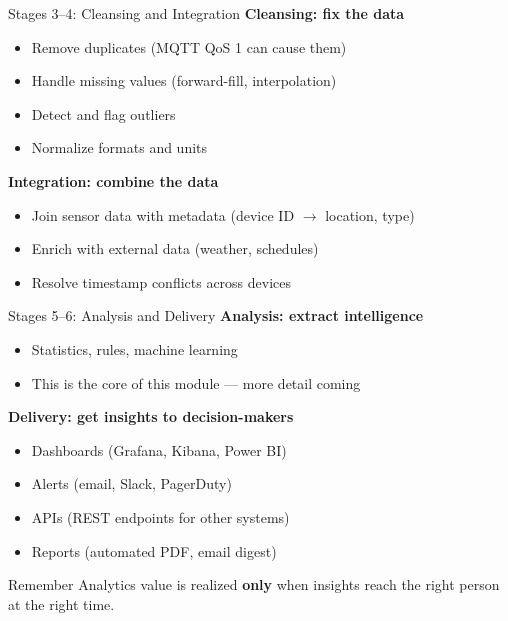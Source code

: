 \documentclass[aspectratio=169,11pt]{beamer}
\begin{document}
\begin{frame}{Stages 3--4: Cleansing and Integration}
    \textbf{Cleansing: fix the data}
    \begin{itemize}
        \item Remove duplicates (MQTT QoS 1 can cause them)
        \item Handle missing values (forward-fill, interpolation)
        \item Detect and flag outliers
        \item Normalize formats and units
    \end{itemize}

    \vspace{0.3cm}
    \textbf{Integration: combine the data}
    \begin{itemize}
        \item Join sensor data with metadata (device ID $\rightarrow$ location, type)
        \item Enrich with external data (weather, schedules)
        \item Resolve timestamp conflicts across devices
    \end{itemize}
\end{frame}

\begin{frame}{Stages 5--6: Analysis and Delivery}
    \textbf{Analysis: extract intelligence}
    \begin{itemize}
        \item Statistics, rules, machine learning
        \item This is the core of this module --- more detail coming
    \end{itemize}

    \vspace{0.3cm}
    \textbf{Delivery: get insights to decision-makers}
    \begin{itemize}
        \item Dashboards (Grafana, Kibana, Power BI)
        \item Alerts (email, Slack, PagerDuty)
        \item APIs (REST endpoints for other systems)
        \item Reports (automated PDF, email digest)
    \end{itemize}

    \vspace{0.3cm}
    \begin{block}{Remember}
        Analytics value is realized \textbf{only} when insights reach the right person at the right time.
    \end{block}
\end{frame}
\end{document}
